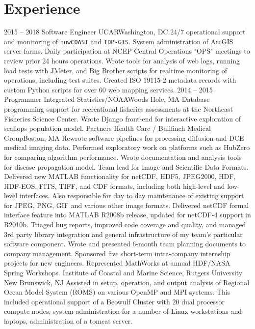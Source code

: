 \documentclass[11pt]{moderncv}  %
\begin{document}
\section{Experience}
\cventry
{2015 -- 2018}
{Software Engineer}
{UCAR}{Washington, DC}{}
{
	24/7 operational support and monitoring of 
	\href{https://nowcoast.noaa.gov}{\texttt{nowCOAST}}
	and
	\href{https://idpgis.ncep.noaa.gov}{\texttt{IDP-GIS}}.
	System administration of ArcGIS server farms.  Daily
	participation at NCEP Central Operations "OPS" meetings to
	review prior 24 hours operations.  Wrote tools for analysis
	of web logs, running load tests with JMeter, and Big Brother
	scripts for realtime monitoring of operations, including
	test suites.  Created ISO 19115-2 metadata records with
	custom Python scripts for over 60 web mapping services.
}
\cventry
{2014 -- 2015}
{Programmer}
{Integrated Statistics/NOAA}{Woods Hole, MA}{}
{
    Database programming support for recreational fisheries assessments
    at the Northeast Fisheries Science Center. Wrote Django front-end
    for interactive exploration of scallops population model.
}
{
	Partners Health Care / Bullfinch Medical Group}{Boston, MA}{}{
    Rewrote software pipelines for processing diffusion and DCE medical
    imaging data.  Performed exploratory work on platforms such as
    HubZero  for comparing algorithm performance. Wrote documentation
    and analysis tools for disease propagation model.
}
{   
    Team lead for Image and Scientific Data Formats.  Delivered
    new MATLAB functionality for netCDF, HDF5, JPEG2000, HDF,
    HDF-EOS, FITS, TIFF, and CDF formats, including both high-level
    and low-level interfaces.  Also responsible for day to day
    maintenance of existing support for JPEG, PNG, GIF and various
    other image formats.  Delivered netCDF formal interface feature
    into MATLAB R2008b release, updated for netCDF-4 support in
    R2010b. Triaged bug reports, improved code coverage and quality,
    and managed 3rd party library integration and general infrastructure
    of my team's particular software component.  Wrote and presented
    6-month team planning documents to company management.  Sponsored
    five short-term intra-company internship projects for new
    engineers.  Represented MathWorks at annual HDF/NASA Spring
    Workshops.
}
{
	Institute of Coastal and Marine Science, Rutgers University}
    {New Brunswick, NJ}{} {
    Assisted in setup,  operation, and output analysis  of Regional
    Ocean Model System (ROMS) on various OpenMP and MPI systems.
    This included operational support of a Beowulf Cluster with 20
    dual processor compute nodes, system administration for a number
    of Linux workstations and laptops, administration of a tomcat
    server.
}
\end{document}
